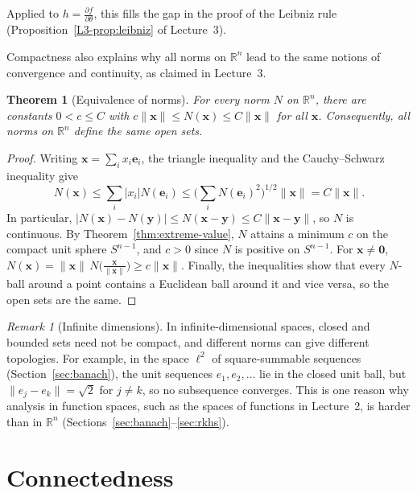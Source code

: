 \documentclass[11pt]{article}
\newcommand{\norm}[1]{\lVert #1 \rVert}
\theoremstyle{definition}
\theoremstyle{plain}
\newtheorem{theorem}[definition]{Theorem}
\theoremstyle{remark}
\newtheorem{remark}[definition]{Remark}
\begin{document}
Applied to $h = \frac{\partial f}{\partial\theta}$, this fills the gap in the proof of the Leibniz rule (Proposition~\ref{L3-prop:leibniz} of Lecture~3).

Compactness also explains why all norms on $\mathbb{R}^n$ lead to the same notions of convergence and continuity, as claimed in Lecture~3.

\begin{theorem}[Equivalence of norms]\label{thm:norms-equivalent}
    For every norm $N$ on $\mathbb{R}^n$, there are constants $0 < c \leq C$ with $c\norm{\mathbf{x}} \leq N(\mathbf{x}) \leq C\norm{\mathbf{x}}$ for all $\mathbf{x}$. Consequently, all norms on $\mathbb{R}^n$ define the same open sets.
\end{theorem}

\begin{proof}
    Writing $\mathbf{x} = \sum_i x_i\mathbf{e}_i$, the triangle inequality and the Cauchy--Schwarz inequality give
    \[N(\mathbf{x}) \leq \sum_i |x_i| N(\mathbf{e}_i) \leq \Big(\sum_i N(\mathbf{e}_i)^2\Big)^{1/2}\norm{\mathbf{x}} = C\norm{\mathbf{x}}.\]
    In particular, $|N(\mathbf{x}) - N(\mathbf{y})| \leq N(\mathbf{x} - \mathbf{y}) \leq C\norm{\mathbf{x} - \mathbf{y}}$, so $N$ is continuous. By Theorem~\ref{thm:extreme-value}, $N$ attains a minimum $c$ on the compact unit sphere $S^{n-1}$, and $c > 0$ since $N$ is positive on $S^{n-1}$. For $\mathbf{x} \neq \mathbf{0}$, $N(\mathbf{x}) = \norm{\mathbf{x}}\, N\big(\frac{\mathbf{x}}{\norm{\mathbf{x}}}\big) \geq c\norm{\mathbf{x}}$. Finally, the inequalities show that every $N$-ball around a point contains a Euclidean ball around it and vice versa, so the open sets are the same.
\end{proof}

\begin{remark}[Infinite dimensions]\label{rem:infinite-dimensions}
    In infinite-dimensional spaces, closed and bounded sets need not be compact, and different norms can give different topologies. For example, in the space $\ell^2$ of square-summable sequences (Section~\ref{sec:banach}), the unit sequences $e_1, e_2, \ldots$ lie in the closed unit ball, but $\norm{e_j - e_k} = \sqrt{2}$ for $j \neq k$, so no subsequence converges. This is one reason why analysis in function spaces, such as the spaces of functions in Lecture~2, is harder than in $\mathbb{R}^n$ (Sections~\ref{sec:banach}--\ref{sec:rkhs}).
\end{remark}

\section{Connectedness}\label{sec:connected}
\end{document}

